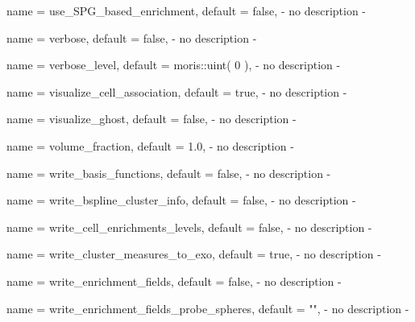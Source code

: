 \begin{parameter}{
    name    = {use_SPG_based_enrichment},
    default = {false},
}
- no description -
\end{parameter}

\begin{parameter}{
    name    = {verbose},
    default = {false},
}
- no description -
\end{parameter}

\begin{parameter}{
    name    = {verbose_level},
    default = {moris::uint( 0 )},
}
- no description -
\end{parameter}

\begin{parameter}{
    name    = {visualize_cell_association},
    default = {true},
}
- no description -
\end{parameter}

\begin{parameter}{
    name    = {visualize_ghost},
    default = {false},
}
- no description -
\end{parameter}

\begin{parameter}{
    name    = {volume_fraction},
    default = {1.0},
}
- no description -
\end{parameter}

\begin{parameter}{
    name    = {write_basis_functions},
    default = {false},
}
- no description -
\end{parameter}

\begin{parameter}{
    name    = {write_bspline_cluster_info},
    default = {false},
}
- no description -
\end{parameter}

\begin{parameter}{
    name    = {write_cell_enrichments_levels},
    default = {false},
}
- no description -
\end{parameter}

\begin{parameter}{
    name    = {write_cluster_measures_to_exo},
    default = {true},
}
- no description -
\end{parameter}

\begin{parameter}{
    name    = {write_enrichment_fields},
    default = {false},
}
- no description -
\end{parameter}

\begin{parameter}{
    name    = {write_enrichment_fields_probe_spheres},
    default = {""},
}
- no description -
\end{parameter}

